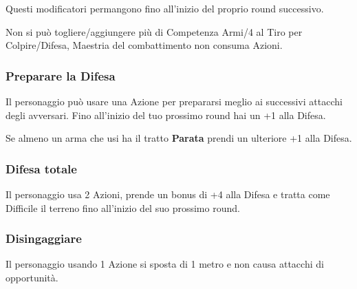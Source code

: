 \begin{multicols}{2}
Questi modificatori permangono fino all'inizio del proprio round successivo.

Non si può togliere/aggiungere più di Competenza Armi/4 al Tiro per Colpire/Difesa, Maestria del combattimento non consuma Azioni.

\subsubsection{Preparare la Difesa}\label{preparareladifesa}\hypertarget{preparareladifesa}{}

Il personaggio può usare una Azione per prepararsi meglio ai successivi attacchi degli avversari. Fino all'inizio del tuo prossimo round hai un +1 alla Difesa.

Se almeno un arma che usi ha il tratto \textbf{Parata} prendi un ulteriore +1 alla Difesa.

\subsubsection{Difesa totale} \label{difesatotale}\hypertarget{difesatotale}{}

Il personaggio usa 2 Azioni, prende un bonus di +4 alla Difesa e tratta come Difficile il terreno fino all'inizio del suo prossimo round.

\subsubsection{Disingaggiare} \label{disingaggiare}\hypertarget{disingaggiare}{}

Il personaggio usando 1 Azione si sposta di 1 metro e non causa attacchi di opportunità.




\end{multicols}
